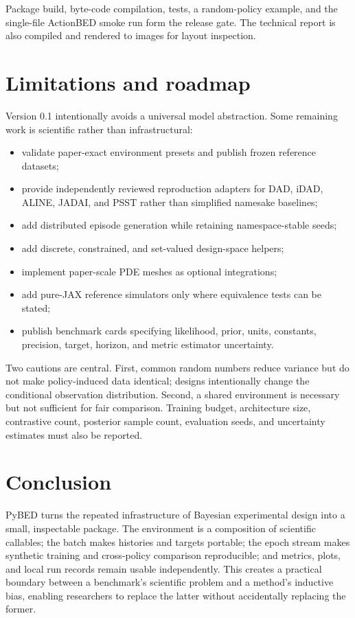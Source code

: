 \documentclass[11pt]{article}
\begin{document}
Package build, byte-code compilation, tests, a random-policy example, and the
single-file ActionBED smoke run form the release gate. The technical report is also
compiled and rendered to images for layout inspection.

\section{Limitations and roadmap}

Version 0.1 intentionally avoids a universal model abstraction. Some remaining work
is scientific rather than infrastructural:
\begin{itemize}
  \item validate paper-exact environment presets and publish frozen reference datasets;
  \item provide independently reviewed reproduction adapters for DAD, iDAD, ALINE,
  JADAI, and PSST rather than simplified namesake baselines;
  \item add distributed episode generation while retaining namespace-stable seeds;
  \item add discrete, constrained, and set-valued design-space helpers;
  \item implement paper-scale PDE meshes as optional integrations;
  \item add pure-JAX reference simulators only where equivalence tests can be stated;
  \item publish benchmark cards specifying likelihood, prior, units, constants,
  precision, target, horizon, and metric estimator uncertainty.
\end{itemize}

Two cautions are central. First, common random numbers reduce variance but do not make
policy-induced data identical; designs intentionally change the conditional
observation distribution. Second, a shared environment is necessary but not sufficient
for fair comparison. Training budget, architecture size, contrastive count, posterior
sample count, evaluation seeds, and uncertainty estimates must also be reported.

\section{Conclusion}

PyBED turns the repeated infrastructure of Bayesian experimental design into a small,
inspectable package. The environment is a composition of scientific callables; the
batch makes histories and targets portable; the epoch stream makes synthetic training
and cross-policy comparison reproducible; and metrics, plots, and local run records
remain usable independently. This creates a practical boundary between a benchmark's
scientific problem and a method's inductive bias, enabling researchers to replace the
latter without accidentally replacing the former.
\end{document}
